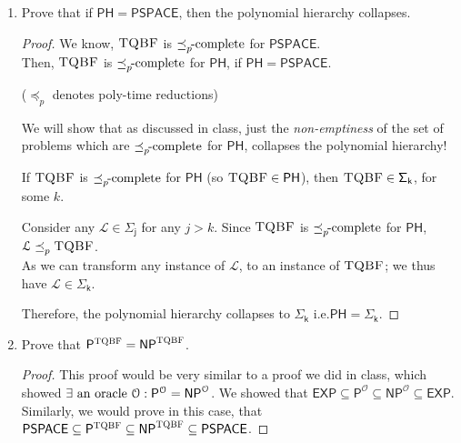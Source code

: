 \documentclass[usletter]{article}
\newcommand {\langset}[1]      {\ensuremath{\mathcal{#1}}}
\newcommand {\namedlangset}[1] {\ensuremath{\textnormal{\textsc{#1}}}}
\newcommand {\family}[1]       {\ensuremath{\mathsf{#1}}}
\newcommand {\reduce}[2]    {\ensuremath{\preceq_{#1}^{#2}}}
\newcommand {\complete}[2]  {\ensuremath{\reduce{#1}{#2}     %
                                         \hspace*{-4pt}\textnormal{-complete}}}
\newcommand{\ie}{\textnormal{i.e.}}
\newcommand {\langL}          {\langset{L}}
\begin{document}
\begin{enumerate}
  \item Prove that if $\family{PH} = \family{PSPACE}$,
        then the polynomial hierarchy collapses.
  \begin{proof}
    We know, \namedlangset{TQBF} is \complete{p}{} for \family{PSPACE}. \\
    Then, \namedlangset{TQBF} is \complete{p}{} for \family{PH},
    if $\family{PH} = \family{PSPACE}$.

    (\reduce{p}{} denotes poly-time reductions)

    We will show that as discussed in class, just the \textit{non-emptiness} of
    the set of problems which are \complete{p}{} for \family{PH}, collapses the
    polynomial hierarchy!

    If \namedlangset{TQBF} is \complete{p}{} for \family{PH}
    (so $\namedlangset{TQBF} \in \family{PH}$),
    then $\namedlangset{TQBF} \in \family{\Sigma_k}$, for some $k$.

    Consider any $\langL \in \family{\Sigma_j}$ for any $j > k$.
    Since \namedlangset{TQBF} is \complete{p}{} for \family{PH},
    $\langL \reduce{p}{} \namedlangset{TQBF}$. \\
    As we can transform any instance of \langL,
    to an instance of \namedlangset{TQBF};
    we thus have $\langL \in \family{\Sigma_k}$.

    Therefore, the polynomial hierarchy collapses to $\family{\Sigma_k}$
    \ie $\family{PH} = \family{\Sigma_k}$.
  \end{proof}

  \item Prove that
        $\family{P}^\namedlangset{TQBF} = \family{NP}^\namedlangset{TQBF}$.
  \begin{proof}
    This proof would be very similar to a proof we did in class, which showed
    $\exists \textnormal{ an oracle } \langset{O}:
      \family{P}^\langset{O} = \family{NP}^\langset{O}$.
    We showed that $\family{EXP} \subseteq \family{P}^\langset{O}
                                 \subseteq \family{NP}^\langset{O}
                                 \subseteq \family{EXP}$.
    Similarly, we would prove in this case, that
    $\family{PSPACE} \subseteq \family{P}^\namedlangset{TQBF}
                     \subseteq \family{NP}^\namedlangset{TQBF}
                     \subseteq \family{PSPACE}$.


\end{proof}
\end{enumerate}
\end{document}
